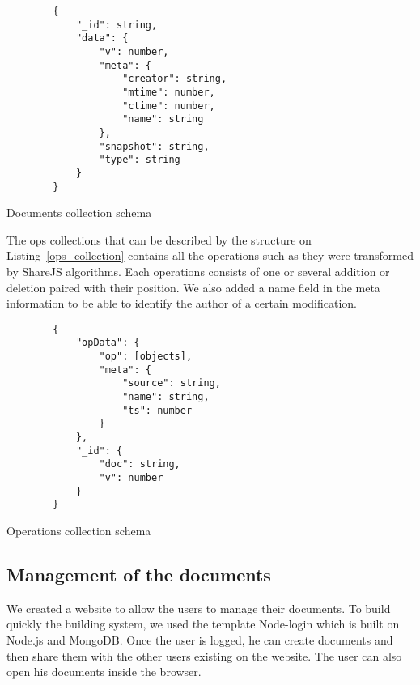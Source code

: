 \documentclass{llncs}
\begin{document}
\begin{listing}
    \begin{verbatim}
        {
            "_id": string,
            "data": {
                "v": number,
                "meta": {
                    "creator": string,
                    "mtime": number,
                    "ctime": number,
                    "name": string
                },
                "snapshot": string,
                "type": string
            }
        }
    \end{verbatim}
    \caption{Documents collection schema} 
    \label{docs_collection}
\end{listing}

The ops collections that can be described by the structure on
Listing~\ref{ops_collection} contains all the operations such as they were
transformed by ShareJS algorithms. Each operations consists of one or several
addition or deletion paired with their position. We also added a name field in
the meta information to be able to identify the author of a certain
modification.

\begin{listing}
    \begin{verbatim}
        {
            "opData": {
                "op": [objects],
                "meta": {
                    "source": string,
                    "name": string,
                    "ts": number
                }
            },
            "_id": {
                "doc": string,
                "v": number
            }
        }
    \end{verbatim}
    \caption{Operations collection schema} 
    \label{ops_collection}
\end{listing}

\subsection{Management of the documents}

We created a website to allow the users to manage their documents.
To build quickly the building system, we used the template Node-login which is built
on Node.js and MongoDB.
Once the user is logged, he can create documents and then share them with the other
users existing on the website. The user can also open his documents inside the browser.
\end{document}

